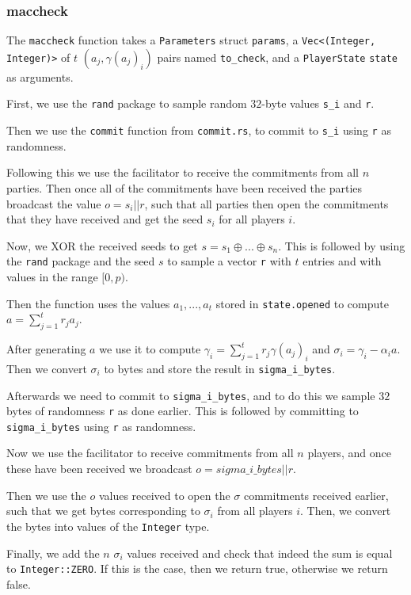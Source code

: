 \documentclass[../main.tex]{subfiles}
\begin{document}
\subsubsection{maccheck}
The \lstinline{maccheck} function takes a \lstinline{Parameters} struct \lstinline{params}, a \lstinline{Vec<(Integer, Integer)>} of $t$ $(a_j, \gamma(a_j)_i)$ pairs named \lstinline{to_check}, and a \lstinline{PlayerState} \lstinline{state} as arguments.

First, we use the \lstinline{rand} package to sample random $32$-byte values  \lstinline{s_i} and \lstinline{r}.

Then we use the \lstinline{commit} function from \lstinline{commit.rs}, to commit to \lstinline{s_i} using \lstinline{r} as randomness.

Following this we use the facilitator to receive the commitments from all $n$ parties. Then once all of the commitments have been received the parties broadcast the value $o = s_i || r$, such that all parties then open the commitments that they have received and get the seed $s_i$ for all players $i$.

Now, we XOR the received seeds to get $s = s_1 \oplus ... \oplus s_n$. This is followed by using the \lstinline{rand} package and the seed $s$ to sample a vector \lstinline{r} with $t$ entries and with values in the range $[0, p)$.

Then the function uses the values $a_1, ..., a_t$ stored in \lstinline{state.opened} to compute $a = \sum^t_{j = 1} r_j a_j$.

After generating $a$ we use it to compute $\gamma_i = \sum^t_{j = 1} r_j \gamma(a_j)_i$ and $\sigma_i = \gamma_i - \alpha_i a$. Then we convert $\sigma_i$ to bytes and store the result in \lstinline{sigma_i_bytes}.

Afterwards we need to commit to \lstinline{sigma_i_bytes}, and to do this we sample $32$ bytes of randomness \lstinline{r} as done earlier. This is followed by committing to \lstinline{sigma_i_bytes} using \lstinline{r} as randomness.

Now we use the facilitator to receive commitments from all $n$ players, and once these have been received we broadcast $o = sigma\_i\_bytes || r$.

Then we use the $o$ values received to open the $\sigma$ commitments received earlier, such that we get bytes corresponding to $\sigma_i$ from all players $i$. Then, we convert the bytes into values of the \lstinline{Integer} type.

Finally, we add the $n$ $\sigma_i$ values received and check that indeed the sum is equal to \lstinline{Integer::ZERO}. If this is the case, then we return true, otherwise we return false.
\end{document}
